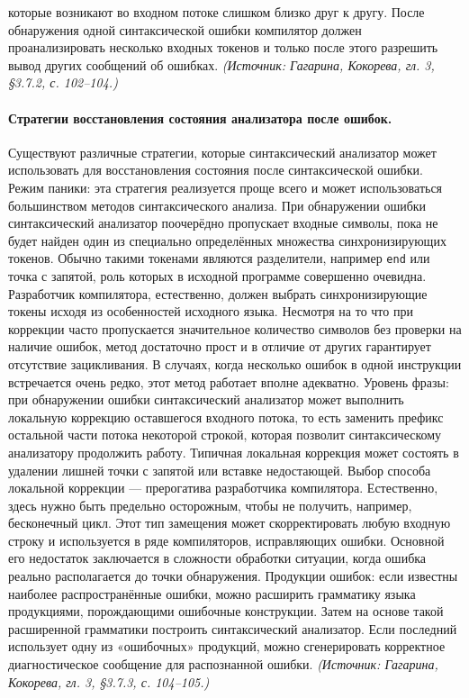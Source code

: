 \documentclass[a4paper,12pt]{article}
\begin{document}
которые возникают во входном потоке слишком близко друг к другу. После обнаружения одной синтаксической ошибки компилятор должен проанализировать несколько входных токенов и только после этого разрешить вывод других сообщений об ошибках.
\textit{(Источник: Гагарина, Кокорева, гл. 3, §3.7.2, с. 102--104.)}

\paragraph{Стратегии восстановления состояния анализатора после ошибок.}
Существуют различные стратегии, которые синтаксический анализатор может использовать для восстановления состояния после синтаксической ошибки. Режим паники: эта стратегия реализуется проще всего и может использоваться большинством методов синтаксического анализа. При обнаружении ошибки синтаксический анализатор поочерёдно пропускает входные символы, пока не будет найден один из специально определённых множества синхронизирующих токенов. Обычно такими токенами являются разделители, например \texttt{end} или точка с запятой, роль которых в исходной программе совершенно очевидна. Разработчик компилятора, естественно, должен выбрать синхронизирующие токены исходя из особенностей исходного языка. Несмотря на то что при коррекции часто пропускается значительное количество символов без проверки на наличие ошибок, метод достаточно прост и в отличие от других гарантирует отсутствие зацикливания. В случаях, когда несколько ошибок в одной инструкции встречается очень редко, этот метод работает вполне адекватно. Уровень фразы: при обнаружении ошибки синтаксический анализатор может выполнить локальную коррекцию оставшегося входного потока, то есть заменить префикс остальной части потока некоторой строкой, которая позволит синтаксическому анализатору продолжить работу. Типичная локальная коррекция может состоять в удалении лишней точки с запятой или вставке недостающей. Выбор способа локальной коррекции — прерогатива разработчика компилятора. Естественно, здесь нужно быть предельно осторожным, чтобы не получить, например, бесконечный цикл. Этот тип замещения может скорректировать любую входную строку и используется в ряде компиляторов, исправляющих ошибки. Основной его недостаток заключается в сложности обработки ситуации, когда ошибка реально располагается до точки обнаружения. Продукции ошибок: если известны наиболее распространённые ошибки, можно расширить грамматику языка продукциями, порождающими ошибочные конструкции. Затем на основе такой расширенной грамматики построить синтаксический анализатор. Если последний использует одну из «ошибочных» продукций, можно сгенерировать корректное диагностическое сообщение для распознанной ошибки.
\textit{(Источник: Гагарина, Кокорева, гл. 3, §3.7.3, с. 104--105.)}
\end{document}
